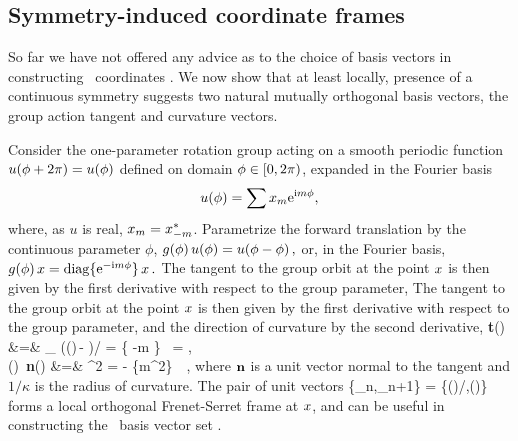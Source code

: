 \subsection{Symmetry-induced coordinate frames}
\label{s:symmIndCoo}

So far we have not offered any advice as to the choice of basis vectors
in constructing \statesp\ coordinates . We now show
that at least locally, presence of a continuous symmetry suggests two
natural mutually orthogonal basis vectors, the group action tangent and
curvature vectors.

Consider the one-parameter rotation group  acting on a smooth
periodic function $u({\bf \phi} + 2\pi) = u({\bf \phi})$ defined on domain
${\bf \phi} \in [0,2\pi)$, expanded in the Fourier basis
\[ %
   u(\gSpace) = \sum \ssp_m \mathrm{e}^{\mathrm{i}m\gSpace},
\] %
where, as $u$ is real, $x_m=x_{-m}^*$. Parametrize the forward
translation by the continuous parameter $\phi$,
\(
    g(\phi)\,u({\bf \phi}) = u({\bf \phi}-\phi)
\,,
\)
or, in the Fourier basis,
\(
   g(\phi) \,x = \mathrm{diag}\{ \mathrm{e}^{-\mathrm{i}m\phi} \} \,x
\,.
\)
The tangent to the group orbit at the point $\ssp$ is then given by
the first derivative with respect to the group parameter,
The tangent to the group orbit at the point $\ssp$ is then given by
the first derivative with respect to the group parameter,
and the direction of curvature by the second derivative,
\bea
   {\bf t}(\ssp) &=&
   \lim_{\gSpace{}}
   \left(\LieEl(\gSpace)\,\ssp - \ssp\right)/\gSpace
   = \{ -m \} \, \ssp = \Lg \ssp,
\label{eq:tang}\\
   \kappa(\ssp)\, {\bf n}(\ssp) &=& \Lg^2 \ssp  = - \{m^2\} \, \ssp
   \,,
\label{eq:curv}
\eea
where $\mathbf{n}$ is a unit vector normal to the tangent and
$1/\kappa$ is the radius of curvature. The pair of unit vectors
    \PC{2011-10-28
    ``As $\Norm{\LieEl(\gSpace)\slicep}$ is a constant, for the group tangent
    vector $\Lg_\gSpace \slicep$ evaluated at $\slicep$ \refeq{eq:tang}
    $\braket{\slicep}{\Lg_\theta\,\slicep}$ vanishes ($\Lg_{\theta}$ is
    antisymmetric).''
The state vector $\ssp$ is not normal to \normVec(\ssp), as $\braket{\ssp
\Lg^2}{\ssp} = - \Norm{\groupTan(\ssp)}^2 \neq 0$, but can one use it to
produce from $\ssp$ the 3. local eigenbasis unit vector? Have not thought
that through. If we do that here, need to rewrite text leading to
\refeq{PCsectQ0}.
    }
\beq
\{{\be_n},{\be_{n+1}}\} =
\{\groupTan(\ssp)/\Norm{\groupTan(\ssp)},\normVec(\ssp)\}
forms a local orthogonal Frenet-Serret frame at $\ssp$, and can be useful
in constructing the \statesp\ basis vector set .


